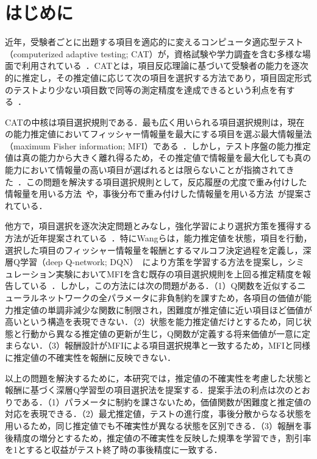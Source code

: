 \documentclass[a4paper,12pt,oneside,openany]{jsbook}
\begin{document}
%
\tableofcontents
%
%
\mainmatter
%
\chapter{はじめに}\label{sec:intro}

近年，受験者ごとに出題する項目を適応的に変えるコンピュータ適応型テスト（computerized adaptive testing; CAT）が，資格試験や学力調査を含む多様な場面で利用されている~\cite{Wainer2000}．CATとは，項目反応理論に基づいて受験者の能力を逐次的に推定し，その推定値に応じて次の項目を選択する方法であり，項目固定形式のテストより少ない項目数で同等の測定精度を達成できるという利点を有する~\cite{Lord1980,Wainer2000}．

CATの中核は項目選択規則である．最も広く用いられる項目選択規則は，現在の能力推定値においてフィッシャー情報量を最大にする項目を選ぶ最大情報量法（maximum Fisher information; MFI）である~\cite{Lord1980}．しかし，テスト序盤の能力推定値は真の能力から大きく離れ得るため，その推定値で情報量を最大化しても真の能力において情報量の高い項目が選ばれるとは限らないことが指摘されてきた~\cite{ChangYing1996}．この問題を解決する項目選択規則として，反応履歴の尤度で重み付けした情報量を用いる方法~\cite{VeerkampBerger1997}や，事後分布で重み付けした情報量を用いる方法~\cite{vanderLinden1998}が提案されている．

他方で，項目選択を逐次決定問題とみなし，強化学習により選択方策を獲得する方法が近年提案されている~\cite{GhoshLan2021,WangLiuXu2024}．特にWangらは，能力推定値を状態，項目を行動，選択した項目のフィッシャー情報量を報酬とするマルコフ決定過程を定義し，深層Q学習（deep Q-network; DQN）~\cite{Mnih2015}により方策を学習する方法を提案し，シミュレーション実験においてMFIを含む既存の項目選択規則を上回る推定精度を報告している~\cite{WangLiuXu2024}．しかし，この方法には次の問題がある．（1）Q関数を近似するニューラルネットワークの全パラメータに非負制約を課すため，各項目の価値が能力推定値の単調非減少な関数に制限され，困難度が推定値に近い項目ほど価値が高いという構造を表現できない．（2）状態を能力推定値だけとするため，同じ状態と行動から異なる推定値の更新が生じ，Q関数が定義する将来価値が一意に定まらない．（3）報酬設計がMFIによる項目選択規準と一致するため，MFIと同様に推定値の不確実性を報酬に反映できない．

以上の問題を解決するために，本研究では，推定値の不確実性を考慮した状態と報酬に基づく深層Q学習型の項目選択法を提案する．提案手法の利点は次のとおりである．（1）パラメータに制約を課さないため，価値関数が困難度と推定値の対応を表現できる．（2）最尤推定値，テストの進行度，事後分散からなる状態を用いるため，同じ推定値でも不確実性が異なる状態を区別できる．（3）報酬を事後精度の増分とするため，推定値の不確実性を反映した規準を学習でき，割引率を1とすると収益がテスト終了時の事後精度に一致する．%
\end{document}
